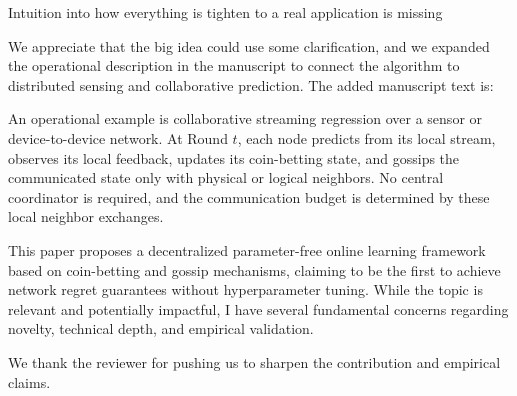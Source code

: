 \documentclass[12pt,english]{reviewresponse}
\begin{document}
\begin{revcomment}
    Intuition into how everything is tighten to a real application is missing
\end{revcomment}
\begin{revresponse}
    We appreciate that the big idea could use some clarification, and we expanded the operational description in the manuscript to connect the algorithm to distributed sensing and collaborative prediction.
    The added manuscript text is:
    \begin{changes}
        An operational example is collaborative streaming regression over a sensor or device-to-device network.
        At Round $t$, each node predicts from its local stream, observes its local feedback, updates its coin-betting state, and gossips the communicated state only with physical or logical neighbors.
        No central coordinator is required, and the communication budget is determined by these local neighbor exchanges.
    \end{changes}
\end{revresponse}

\reviewer{}
\begin{generalcomment}
    This paper proposes a decentralized parameter-free online learning framework based on coin-betting and gossip mechanisms, claiming to be the first to achieve network regret guarantees without hyperparameter tuning. While the topic is relevant and potentially impactful, I have several fundamental concerns regarding novelty, technical depth, and empirical validation.
\end{generalcomment}
\begin{revresponse}
    We thank the reviewer for pushing us to sharpen the contribution and empirical claims.
\end{revresponse}
\end{document}
